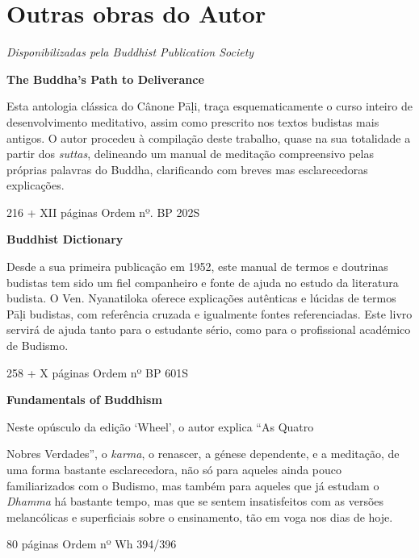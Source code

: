 \chapter{Outras obras do Autor}

\emph{Disponibilizadas pela Buddhist Publication Society}

\textbf{The Buddha's Path to Deliverance}

Esta antologia clássica do Cânone Pāḷi, traça esquematicamente o curso inteiro de desenvolvimento meditativo, assim como prescrito nos textos budistas mais antigos. O autor procedeu à compilação deste trabalho, quase na sua totalidade a partir dos \emph{suttas}, delineando um manual de meditação compreensivo pelas próprias palavras do Buddha, clarificando com breves mas esclarecedoras explicações.

216 + XII páginas Ordem nº. BP 202S

\textbf{Buddhist Dictionary}

Desde a sua primeira publicação em 1952, este manual de termos e doutrinas budistas tem sido um fiel companheiro e fonte de ajuda no estudo da literatura budista. O Ven. Nyanatiloka oferece explicações autênticas e lúcidas de termos Pāḷi budistas, com referência cruzada e igualmente fontes referenciadas. Este livro servirá de ajuda tanto para o estudante sério, como para o profissional académico de Budismo.

258 + X páginas Ordem nº BP 601S

\textbf{Fundamentals of Buddhism}

Neste opúsculo da edição `Wheel', o autor explica ``As Quatro

Nobres Verdades'', o \emph{karma}, o renascer, a génese dependente, e a meditação, de uma forma bastante esclarecedora, não só para aqueles ainda pouco familiarizados com o Budismo, mas também para aqueles que já estudam o \emph{Dhamma} há bastante tempo, mas que se sentem insatisfeitos com as versões melancólicas e superficiais sobre o ensinamento, tão em voga nos dias de hoje.

80 páginas Ordem nº Wh 394/396

